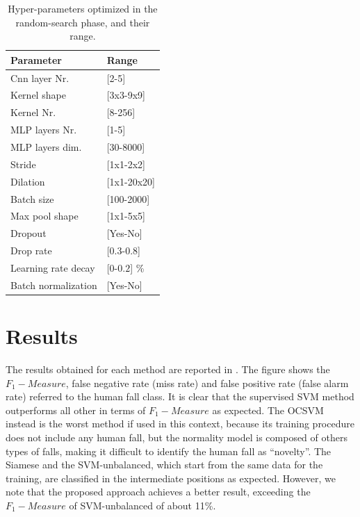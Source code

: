 \begin{table}[ht]
	\caption{Hyper-parameters optimized in the random-search phase, and their range.}\label{tab:random_search_params}
	\centering
	
	\begin{tabular} {|K{4cm}|K{4cm}|}
		\hline
		\textbf{Parameter} 		& \textbf{Range} \\  
		\hline
		Cnn layer Nr. 	& [2-5]		                          \\
		\hline
		Kernel shape 	& [3x3-9x9]  \footnotemark[3]      \\
		\hline									
		Kernel Nr. 		& [8-256]	                            \\
		\hline                      
		MLP layers Nr. 	&	[1-5]	                          \\
		\hline
		MLP layers dim.	&[30-8000]                            \\
		\hline
		Stride & [1x1-2x2]			                          \\
		\hline
		Dilation & [1x1-20x20]\footnotemark[3]   \\
		\hline
		Batch size	&	[100-2000]                                    						\\
		\hline 
		Max pool shape & [1x1-5x5]\footnotemark[3]      \\
		\hline
		Dropout & [Yes-No]                    \\
		\hline
		Drop rate	&	[0.3-0.8]                         \\
		\hline
		Learning rate decay	&	[$0$-$0.2$] \%     \\
		\hline                
		Batch normalization	&	[Yes-No]                    \\
		\hline
		
	\end{tabular}
\end{table}



\section{Results}
\label{sec:Results}
The results obtained for each method are reported in . The figure shows the $ F_1 -Measure$, false negative rate (miss rate) and false positive rate (false alarm rate) referred to the human fall class. It is clear that the supervised SVM method outperforms all other in terms of  $ F_1 -Measure$ as expected. The OCSVM instead is the worst method if used in this context, because its training procedure does not include any human fall, but the normality model is composed of others types of falls, making it difficult to identify the human fall as ``novelty''. The Siamese and the SVM-unbalanced, which start from the same data for the training, are classified in the intermediate positions as expected. However, we note that the proposed approach achieves a better result, exceeding the $ F_1 -Measure$ of SVM-unbalanced of about 11\%. 

